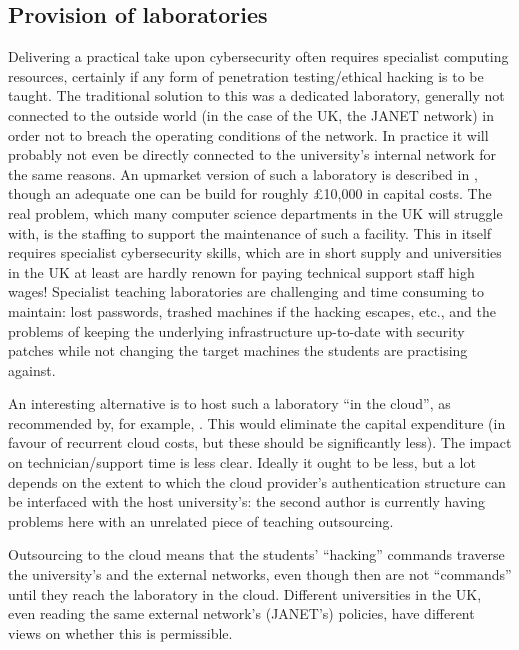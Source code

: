 \documentclass[conference]{IEEEtran}
\begin{document}
\subsection{Provision of laboratories}
Delivering a practical take upon cybersecurity often requires specialist computing resources, certainly if any form of penetration testing/ethical hacking is to be taught. The traditional solution to this was a dedicated laboratory, generally not connected to the outside world (in the case of the UK, the JANET network)  in order not to breach the operating conditions of the network. In practice it will probably not even be directly connected to the university's internal network for the same reasons.  An upmarket version of such a laboratory is described in \cite{Abler2006}, though an adequate one can be build for roughly \pounds10,000 in capital costs.  The real problem, which many computer science departments in the UK will struggle with, is the staffing to support the maintenance of such a facility. This in itself requires specialist cybersecurity skills, which are in short supply and universities in the UK at least are hardly renown for paying technical support staff high wages! Specialist teaching laboratories are challenging and time consuming to maintain: lost passwords, trashed machines if the hacking escapes, etc., and the problems of keeping the underlying infrastructure up-to-date with security patches while not changing the target machines the students are practising against.

An interesting alternative is to host such a laboratory ``in the cloud'', as recommended by, for example, \cite{Salah2014a}. This would eliminate the capital expenditure (in favour of recurrent cloud costs, but these should be significantly less). The impact on technician/support time is less clear. Ideally it ought to be less, but a lot depends on the extent to which the cloud provider's authentication structure can be interfaced with the host university's: the second author is currently having problems here with an unrelated piece of teaching outsourcing.

Outsourcing to the cloud means that the students' ``hacking'' commands traverse the university's and the external networks, even though then are not ``commands'' until they reach the laboratory in the cloud. Different universities in the UK, even reading the same external network's (JANET's) policies, have different views on whether this is permissible.

\end{document}
